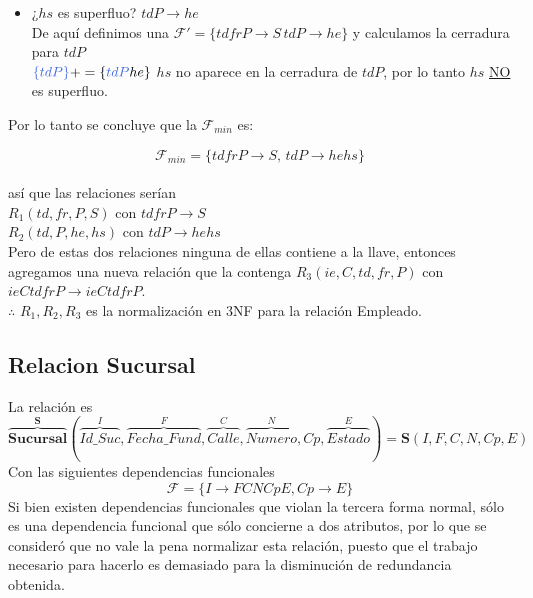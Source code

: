 \documentclass[10pt]{article}
\begin{document}
\begin{itemize}
\begin{itemize}
   		\item ¿$hs$ es superfluo? $tdP \rightarrow he$\\
   		De aquí definimos una $\mathcal{F'} = \{tdfrP \rightarrow S \,tdP \rightarrow he\}$ y calculamos la cerradura para $tdP$\\
   		$\textcolor{RoyalBlue}{\{tdP\}}+= \{\textcolor{RoyalBlue}{tdP}he\}$
   		$hs$ no aparece en la cerradura de $tdP$, por lo tanto $hs$ \underline{NO} es superfluo.\\
   		
   		
   		
   		 
   		
   		
   	\end{itemize}
   
   Por lo tanto se concluye que la $\mathcal{F}_{min}$ es:
   
   \[\mathcal{F}_{min}=\{ tdfrP \rightarrow S,\, tdP \rightarrow hehs\}\]\\
   
   así que las relaciones serían\\
   
   $R_1(td,fr,P,S)$ con $ tdfrP \rightarrow S$  \\
   $R_2(td,P,he,hs)$ con $ tdP \rightarrow hehs $\\
   
   Pero de estas dos relaciones ninguna de ellas contiene a la llave, entonces agregamos una nueva relación que la contenga $R_3(ie,C,td,fr,P)$ con  $ieCtdfrP \rightarrow ieCtdfrP$.\\
   	
   	$\therefore \,\, {R_1, R_2, R_3} $  es la normalización en 3NF para la relación Empleado.
   	
   \end{itemize}

   \subsection{Relacion Sucursal}
   La relación es 
   \[\overbrace{{\textbf{Sucursal}}}^{\textbf{S}} 
   (
	   \overbrace{Id\_Suc}^{I}, \overbrace{Fecha\_Fund}^{F},
	   \overbrace{Calle}^{C}, \overbrace{Numero}^{N}, Cp,
	   \overbrace{Estado}^{E}
	)
	= 
	\textbf{S}(I, F, C, N, Cp, E)
	\]
   Con las siguientes dependencias funcionales
   \[\mathcal{F} = \{I \rightarrow FCNCpE, Cp \rightarrow E\}\]
   Si bien existen dependencias funcionales que violan la tercera forma normal,
   sólo es una dependencia funcional que sólo concierne a dos atributos, por lo
   que se consideró que no vale la pena normalizar esta relación, puesto que el
   trabajo necesario para hacerlo es demasiado para la disminución de redundancia
   obtenida.
	
\end{document}
